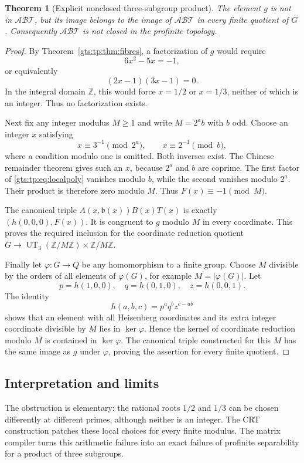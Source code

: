 \documentclass[11pt,letterpaper]{article}
\newtheorem{theorem}{Theorem}[section]
\theoremstyle{definition}
\theoremstyle{remark}
\newcommand{\ZZ}{\mathbb Z}
\newcommand{\calA}{\mathcal A}
\newcommand{\calB}{\mathcal B}
\newcommand{\calT}{\mathcal T}
\newcommand{\bn}{\mathfrak b}
\begin{document}
\begin{theorem}[Explicit nonclosed three-subgroup product]\label{gts:tp:thm:nonclosed}
The element $g$ is not in $\calA\calB\calT$, but its image belongs to the
image of $\calA\calB\calT$ in every finite quotient of $G$. Consequently
$\calA\calB\calT$ is not closed in the profinite topology.
\end{theorem}
\begin{proof}
By Theorem~\ref{gts:tp:thm:fibres}, a factorization of $g$ would require
\[
                6x^2-5x=-1,
\]
or equivalently
\begin{equation}\label{gts:tp:eq:localpoly}
                    (2x-1)(3x-1)=0.
\end{equation}
In the integral domain $\ZZ$, this would force $x=1/2$ or $x=1/3$, neither
of which is an integer. Thus no factorization exists.

Next fix any integer modulus $M\geq1$ and write $M=2^a b$ with $b$ odd.
Choose an integer $x$ satisfying
\[
 x\equiv3^{-1}\pmod{2^a},\qquad x\equiv2^{-1}\pmod b,
\]
where a condition modulo one is omitted. Both inverses exist. The Chinese
remainder theorem gives such an $x$, because $2^a$ and $b$ are coprime.
The first factor of \eqref{gts:tp:eq:localpoly} vanishes modulo $b$, while the
second vanishes modulo $2^a$. Their product is therefore zero modulo $M$.
Thus $F(x)\equiv-1\pmod M$.

The canonical triple $A(x,\bn(x))B(x)T(x)$ is exactly
$(h(0,0,0),F(x))$. It is congruent to $g$ modulo $M$ in every coordinate.
This proves the required inclusion for the coordinate reduction quotient
$G\to\operatorname{UT}_3(\ZZ/M\ZZ)\times\ZZ/M\ZZ$.

Finally let $\varphi:G\to Q$ be any homomorphism to a finite group. Choose
$M$ divisible by the orders of all elements of $\varphi(G)$, for example
$M=|\varphi(G)|$. Let
\[
       p=h(1,0,0),\quad q=h(0,1,0),\quad z=h(0,0,1).
\]
The identity
\[
                      h(a,b,c)=p^a q^b z^{c-ab}
\]
shows that an element with all Heisenberg coordinates and its extra integer
coordinate divisible by $M$ lies in $\ker\varphi$. Hence the kernel of
coordinate reduction modulo $M$ is contained in $\ker\varphi$. The
canonical triple constructed for this $M$ has the same image as $g$ under
$\varphi$, proving the assertion for every finite quotient.
\end{proof}

\subsection{Interpretation and limits}
The obstruction is elementary: the rational roots $1/2$ and $1/3$ can be
chosen differently at different primes, although neither is an integer.
The CRT construction patches these local choices for every finite modulus.
The matrix compiler turns this arithmetic failure into an exact failure of
profinite separability for a product of three subgroups.
\end{document}

